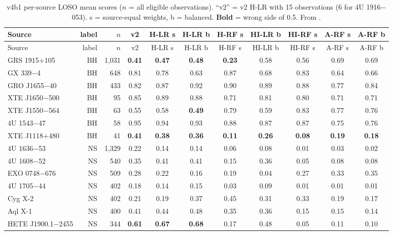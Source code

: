 {\scriptsize\setlength{\tabcolsep}{3pt}
\begin{longtable}{@{}lrr*{8}{c}@{}}
\caption[v4b1 per-source scores]{v4b1 per-source LOSO mean scores ($n$ = all eligible observations). ``v2'' = v2 H-LR
with 15 observations (6 for 4U 1916$-$053). s = source-equal weights, b = balanced. \textbf{Bold} = wrong side of 0.5.
From .}\label{tab:p2v4b1persource}\\
\toprule
Source & label & $n$ & v2 & H-LR s & H-LR b & H-RF s & HI-LR b & HI-RF s & A-RF s & A-RF b \\
\midrule\endfirsthead
\toprule Source & label & $n$ & v2 & H-LR s & H-LR b & H-RF s & HI-LR b & HI-RF s & A-RF s & A-RF b \\ \midrule\endhead
\bottomrule\endfoot
GRS 1915+105 & BH & 1,031 & \textbf{0.41} & \textbf{0.47} & \textbf{0.48} & \textbf{0.23} & 0.58 & 0.56 & 0.69 & 0.69 \\
GX 339$-$4 & BH & 648 & 0.81 & 0.78 & 0.63 & 0.87 & 0.68 & 0.83 & 0.64 & 0.66 \\
GRO J1655$-$40 & BH & 433 & 0.82 & 0.87 & 0.92 & 0.90 & 0.89 & 0.88 & 0.77 & 0.84 \\
XTE J1650$-$500 & BH & 95 & 0.85 & 0.89 & 0.88 & 0.71 & 0.81 & 0.80 & 0.71 & 0.71 \\
XTE J1550$-$564 & BH & 63 & 0.55 & 0.58 & \textbf{0.49} & 0.79 & 0.59 & 0.83 & 0.77 & 0.76 \\
4U 1543$-$47 & BH & 58 & 0.95 & 0.94 & 0.93 & 0.88 & 0.87 & 0.87 & 0.75 & 0.76 \\
XTE J1118+480 & BH & 41 & \textbf{0.41} & \textbf{0.38} & \textbf{0.36} & \textbf{0.11} & \textbf{0.26} & \textbf{0.08} & \textbf{0.19} & \textbf{0.18} \\
4U 1636$-$53 & NS & 1,329 & 0.22 & 0.14 & 0.14 & 0.06 & 0.08 & 0.01 & 0.03 & 0.02 \\
4U 1608$-$52 & NS & 540 & 0.35 & 0.41 & 0.41 & 0.15 & 0.36 & 0.05 & 0.08 & 0.08 \\
EXO 0748$-$676 & NS & 509 & 0.28 & 0.22 & 0.16 & 0.19 & 0.04 & 0.27 & 0.33 & 0.35 \\
4U 1705$-$44 & NS & 402 & 0.18 & 0.14 & 0.15 & 0.03 & 0.09 & 0.01 & 0.01 & 0.01 \\
Cyg X-2 & NS & 402 & 0.21 & 0.19 & 0.37 & 0.45 & 0.31 & 0.33 & 0.19 & 0.17 \\
Aql X-1 & NS & 400 & 0.41 & 0.44 & 0.48 & 0.35 & 0.36 & 0.15 & 0.15 & 0.14 \\
HETE J1900.1$-$2455 & NS & 344 & \textbf{0.61} & \textbf{0.67} & \textbf{0.68} & 0.17 & 0.48 & 0.05 & 0.11 & 0.10 \\

\end{longtable}}
